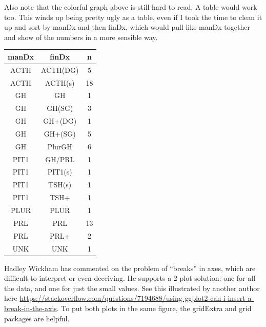 \documentclass[]{book}
\newenvironment{Shaded}{\begin{snugshade}}{\end{snugshade}}
\newcommand{\DataTypeTok}[1]{\textcolor[rgb]{0.13,0.29,0.53}{#1}}
\newcommand{\DecValTok}[1]{\textcolor[rgb]{0.00,0.00,0.81}{#1}}
\newcommand{\KeywordTok}[1]{\textcolor[rgb]{0.13,0.29,0.53}{\textbf{#1}}}
\newcommand{\NormalTok}[1]{#1}
\newcommand{\OperatorTok}[1]{\textcolor[rgb]{0.81,0.36,0.00}{\textbf{#1}}}
\newcommand{\OtherTok}[1]{\textcolor[rgb]{0.56,0.35,0.01}{#1}}
\newcommand{\StringTok}[1]{\textcolor[rgb]{0.31,0.60,0.02}{#1}}
\begin{document}
Also note that the colorful graph above is still hard to read. A table would work too. This winds up being pretty ugly as a table, even if I took the time to clean it up and sort by manDx and then finDx, which would pull like manDx together and show of the numbers in a more sensible way.

\begin{Shaded}
\end{Shaded}

\begin{tabular}{c|c|c}
\hline
manDx & finDx & n\\
\hline
ACTH & ACTH(DG) & 5\\
\hline
ACTH & ACTH(s) & 18\\
\hline
GH & GH & 1\\
\hline
GH & GH(SG) & 3\\
\hline
GH & GH+(DG) & 1\\
\hline
GH & GH+(SG) & 5\\
\hline
GH & PlurGH & 6\\
\hline
PIT1 & GH/PRL & 1\\
\hline
PIT1 & PIT1(s) & 1\\
\hline
PIT1 & TSH(s) & 1\\
\hline
PIT1 & TSH+ & 1\\
\hline
PLUR & PLUR & 1\\
\hline
PRL & PRL & 13\\
\hline
PRL & PRL+ & 2\\
\hline
UNK & UNK & 1\\
\hline
\end{tabular}

Hadley Wickham has commented on the problem of ``breaks'' in axes, which are difficult to interpret or even deceiving. He supports a 2 plot solution: one for all the data, and one for just the small values. See this illustrated by another author here \url{https://stackoverflow.com/questions/7194688/using-ggplot2-can-i-insert-a-break-in-the-axis}.
To put both plots in the same figure, the gridExtra and grid packages are helpful.
\end{document}
